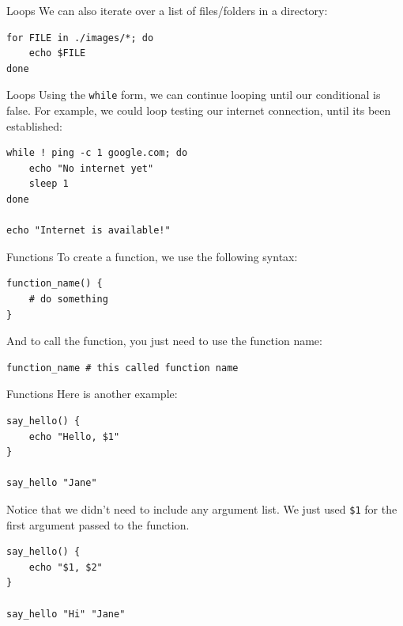 \documentclass[10pt]{beamer}
\begin{document}
\begin{frame}[label={sec:orgd5fa63a},fragile]{Loops}
 We can also iterate over a list of files/folders in a directory:

\begin{verbatim}
for FILE in ./images/*; do
    echo $FILE
done
\end{verbatim}
\end{frame}

\begin{frame}[label={sec:orgb0fc39d},fragile]{Loops}
 Using the \texttt{while} form, we can continue looping until our conditional is
false. For example, we could loop testing our internet connection, until its
been established:

\begin{verbatim}
while ! ping -c 1 google.com; do
    echo "No internet yet"
    sleep 1
done

echo "Internet is available!"
\end{verbatim}
\end{frame}

\begin{frame}[label={sec:orgafd464d},fragile]{Functions}
 To create a function, we use the following syntax:

\begin{verbatim}
function_name() {
    # do something
}
\end{verbatim}

And to call the function, you just need to use the function name:

\begin{verbatim}
function_name # this called function name
\end{verbatim}
\end{frame}

\begin{frame}[label={sec:org56a0b6c},fragile]{Functions}
 Here is another example:

\begin{verbatim}
say_hello() {
    echo "Hello, $1"
}

say_hello "Jane"
\end{verbatim}

Notice that we didn't need to include any argument list. We just used \texttt{\$1} for the
first argument passed to the function.

\begin{verbatim}
say_hello() {
    echo "$1, $2"
}

say_hello "Hi" "Jane"
\end{verbatim}
\end{frame}
\end{document}
